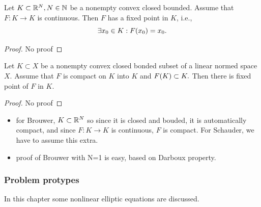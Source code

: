 \documentclass{article}
\begin{document}
\begin{theorem}
	Let $K \subset {\mathbb R}^N, N \in {\mathbb N}$ be a nonempty convex closed bounded. Assume that $F: K \to K$ is continuous. Then $F$ has a fixed point in $K$, i.e.,
	\[
		\exists x_0 \in K: F\qty(x_{0}) = x_0.
	\]
\end{theorem}
\begin{proof}
	No proof
\end{proof}
\begin{theorem}
	Let $K \subset X$ be a nonempty convex closed bonded subset of a linear normed space $X$. Assume that $F$ is compact on $K$ into $K$ and $F\qty(K) \subset K.$ Then there is fixed point of $F$ in $K.$
\end{theorem}
\begin{proof}
	No proof
\end{proof}
\begin{itemize}
	\item for Brouwer, $K \subset {\mathbb R}^N$ so since it is closed and bouded, it is automatically compact, and since $F: K \to K$ is continuous, $F$ is compact. For Schauder, we have to assume this extra.
	\item proof of Brouwer with N=1 is easy, based on Darboux property.
\end{itemize}

\subsubsection{Problem protypes}
\label{sec:prototypes}

In this chapter some nonlinear elliptic equations are discussed.
\end{document}
